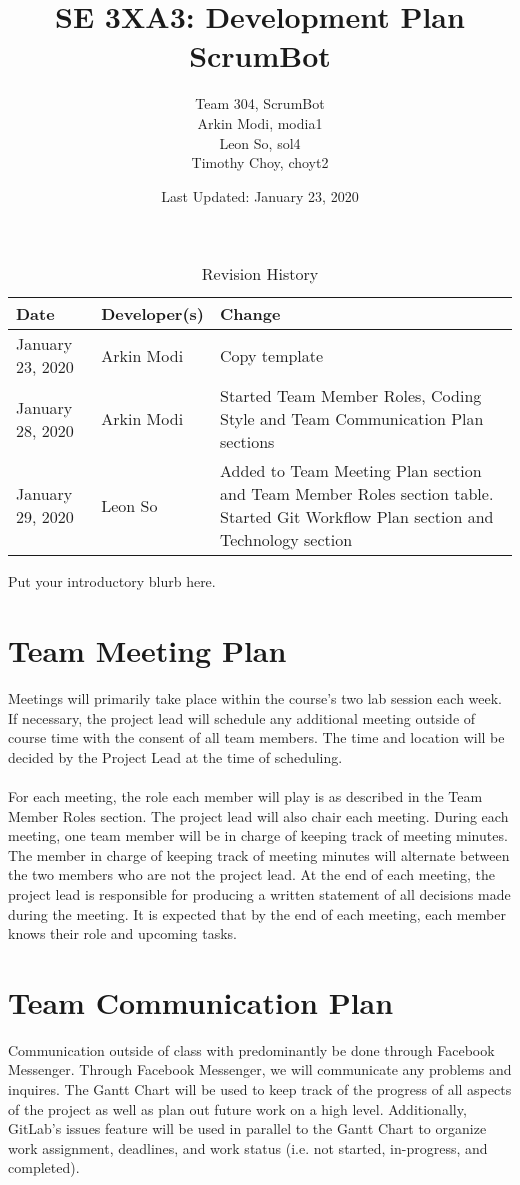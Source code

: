 \documentclass{article}
\title{SE 3XA3: Development Plan\\ScrumBot}
\author{
    Team 304, ScrumBot
        \\ Arkin Modi, modia1
        \\ Leon So, sol4
        \\ Timothy Choy, choyt2
}
\date{Last Updated: January 23, 2020}
\begin{document}
\begin{table}[hp]
    \caption{Revision History} \label{TblRevisionHistory}
    \begin{tabularx}{\textwidth}{llX}
        \toprule
            \textbf{Date} & \textbf{Developer(s)} & \textbf{Change}\\
        \midrule
            January 23, 2020 & Arkin Modi & Copy template\\
            January 28, 2020 & Arkin Modi & Started Team Member Roles, Coding Style and Team Communication Plan sections\\
            January 29, 2020 & Leon So & Added to Team Meeting Plan section and Team Member Roles section table. Started Git Workflow Plan section and Technology section\\
        \bottomrule
    \end{tabularx}
\end{table}

\newpage

\maketitle

Put your introductory blurb here.

\section{Team Meeting Plan}
Meetings will primarily take place within the course's two lab session each week. If necessary, the project lead will schedule any additional meeting outside of course time with the consent of all team members. The time and location will be decided by the Project Lead at the time of scheduling. 
\\\\
\noindent For each meeting, the role each member will play is as described in the Team Member Roles section. The project lead will also chair each meeting. During each meeting, one team member will be in charge of keeping track of meeting minutes. The member in charge of keeping track of meeting minutes will alternate between the two members who are not the project lead. At the end of each meeting, the project lead is responsible for producing a written statement of all decisions made during the meeting. It is expected that by the end of each meeting, each member knows their role and upcoming tasks.

\section{Team Communication Plan}
Communication outside of class with predominantly be done through Facebook Messenger. Through Facebook Messenger, we will communicate any problems and inquires. The Gantt Chart will be used to keep track of the progress of all aspects of the project as well as plan out future work on a high level. Additionally, GitLab's issues feature will be used in parallel to the Gantt Chart to organize work assignment, deadlines, and work status (i.e. not started, in-progress, and completed).
\end{document}
